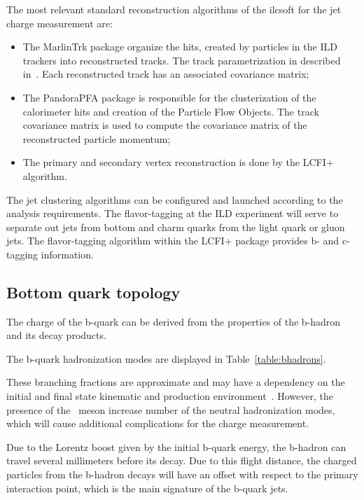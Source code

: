 The most relevant standard reconstruction algorithms of the {\sc ilcsoft} for the jet charge measurement are:
\begin{itemize}
\item The MarlinTrk package organize the hits, created by particles in the ILD trackers into reconstructed tracks. The track parametrization in described in~\cite{bib:LCIOtrack}. Each reconstructed track has an associated covariance matrix;
\item The PandoraPFA package is responsible for the clusterization of the calorimeter hits and creation of the Particle Flow Objects. The track covariance matrix is used to compute the covariance matrix of the reconstructed particle momentum; 
\item The primary and secondary vertex reconstruction is done by the LCFI+ algorithm. 
\end{itemize}
The jet clustering algorithms can be configured and launched according to the analysis requirements. 
The flavor-tagging at the ILD experiment will serve to separate out jets from bottom and charm quarks from the light quark or gluon jets.
The flavor-tagging algorithm within the LCFI+ package provides  b- and c-tagging information.



\subsection{Bottom quark topology}

The charge of the b-quark can be derived from the properties of the b-hadron and its decay products. 


The b-quark hadronization modes are displayed in Table~\ref{table:bhadrons}.


These branching fractions are approximate and may have a dependency on the initial and final state kinematic and production environment~\cite{bib:PDG}.
However, the presence of the \Bzs\ meson increase number of the neutral hadronization modes, which will cause additional complications for the charge measurement. 

Due to the Lorentz boost given by the initial b-quark energy, the b-hadron can travel several millimeters before its decay. Due to this flight distance, the charged particles from the b-hadron decays will have an offset with respect to the primary interaction point, which is the main signature of the b-quark jets. 

